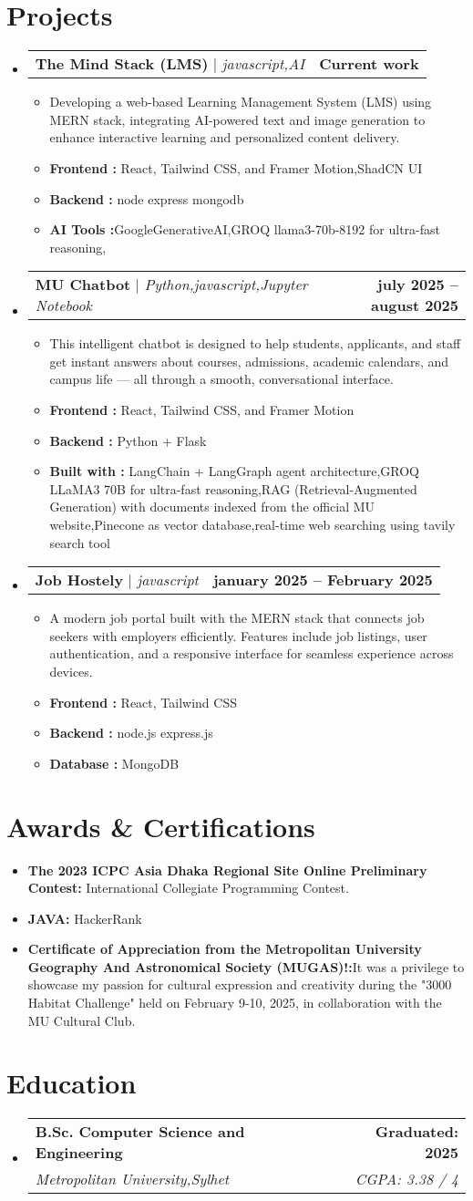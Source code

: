 \documentclass[letterpaper,11pt]{article}
\makeatletter
\newcommand{\resumeItem}[1]{\item\small{{#1 \vspace{-2pt}}}}
\newcommand{\resumeSubheading}[4]{
  \vspace{-2pt}\item
    \begin{tabular*}{1.0\textwidth}[t]{l@{\extracolsep{\fill}}r}
      \textbf{#1} & \textbf{\small #2} \\
      \textit{\small#3} & \textit{\small #4} \\
    \end{tabular*}\vspace{-6pt}
}
\newcommand{\resumeProjectHeading}[2]{
    \item
    \begin{tabular*}{1.001\textwidth}{l@{\extracolsep{\fill}}r}
      \small#1 & \textbf{\small #2}\\
    \end{tabular*}\vspace{-6pt}
}
\newcommand{\resumeItemListStart}{\begin{itemize}}
\newcommand{\resumeItemListEnd}{\end{itemize}\vspace{-5pt}}
\newcommand{\resumeSubHeadingListStart}{\begin{itemize}[leftmargin=0.0in, label={}]}
\newcommand{\resumeSubHeadingListEnd}{\end{itemize}}
\makeatother
\begin{document}
\section{Projects}
\resumeSubHeadingListStart
     \resumeProjectHeading
      {\textbf{The Mind Stack (LMS)} $|$ \emph{javascript,AI}}{Current work}
      \resumeItemListStart
        \resumeItem{Developing a web-based Learning Management System (LMS) using MERN stack, integrating AI-powered text and image generation to enhance interactive learning and personalized content delivery.}
        \resumeItem{\textbf{Frontend :} React, Tailwind CSS, and Framer Motion,ShadCN UI}
         \resumeItem{\textbf{Backend :} node express mongodb}
          \resumeItem{\textbf{AI Tools :}GoogleGenerativeAI,GROQ llama3-70b-8192 for ultra-fast reasoning,}
      \resumeItemListEnd
  \resumeProjectHeading
      {\textbf{MU Chatbot} $|$ \emph{Python,javascript,Jupyter Notebook }}{july 2025 -- august 2025}
      \resumeItemListStart
        \resumeItem{This intelligent chatbot is designed to help students, applicants, and staff get instant answers about courses, admissions, academic calendars, and campus life — all through a smooth, conversational interface.}
        \resumeItem{\textbf{Frontend :} React, Tailwind CSS, and Framer Motion}
         \resumeItem{\textbf{Backend :} Python + Flask}
          \resumeItem{\textbf{Built with :} LangChain + LangGraph agent architecture,GROQ LLaMA3 70B for ultra-fast reasoning,RAG (Retrieval-Augmented Generation) with documents indexed from the official MU website,Pinecone as vector database,real-time web searching using tavily search tool}
      \resumeItemListEnd
 \resumeProjectHeading
      {\textbf{Job Hostely} $|$ \emph{javascript }}{january 2025 -- February 2025}
      \resumeItemListStart
        \resumeItem{A modern job portal built with the MERN stack that connects job seekers with employers efficiently. Features include job listings, user authentication, and a responsive interface for seamless experience across devices.}
        \resumeItem{\textbf{Frontend :} React, Tailwind CSS}
         \resumeItem{\textbf{Backend :} node.js express.js}
          \resumeItem{\textbf{Database :} MongoDB}
      \resumeItemListEnd
 
\resumeSubHeadingListEnd

\section{Awards \& Certifications}
\resumeItemListStart
  \resumeItem{\textbf{The 2023 ICPC Asia Dhaka Regional Site Online Preliminary Contest:}  International Collegiate Programming Contest.}
  \resumeItem{\textbf{JAVA:} HackerRank}
  \resumeItem{\textbf{Certificate of Appreciation from the Metropolitan University Geography And Astronomical Society (MUGAS)!:}It was a privilege to showcase my passion for cultural expression and creativity during the "3000 Habitat Challenge" held on February 9-10, 2025, in collaboration with the MU Cultural Club.}
\resumeItemListEnd

\section{Education}
\resumeSubHeadingListStart
  \resumeSubheading
    {B.Sc. Computer Science and Engineering}{Graduated: 2025}
    {Metropolitan University,Sylhet}{CGPA: 3.38 / 4}
\resumeSubHeadingListEnd
\end{document}
